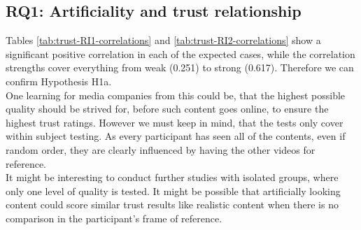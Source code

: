 \documentclass[
  a4paper,  %
  twoside,  %
  bibliography=totoc,
  headsepline,
  cleardoublepage=empty,
  parskip=half,
  draft=false
]{scrbook}
\begin{document}
\subsection{RQ1: Artificiality and trust relationship}
\label{subsec:RQ1}
Tables \ref{tab:trust-RI1-correlations} and \ref{tab:trust-RI2-correlations} show a significant positive correlation in each of the expected cases, while the correlation strengths cover everything from weak (0.251) to strong (0.617). Therefore we can confirm Hypothesis H1a. \\
One learning for media companies from this could be, that the highest possible quality should be strived for, before such content goes online, to ensure the highest trust ratings. However we must keep in mind, that the tests only cover within subject testing. As every participant has seen all of the contents, even if random order, they are clearly influenced by having the other videos for reference. \\
It might be interesting to conduct further studies with isolated groups, where only one level of quality is tested. It might be possible that artificially looking content could score similar trust results like realistic content when there is no comparison in the participant's frame of reference.
\end{document}
